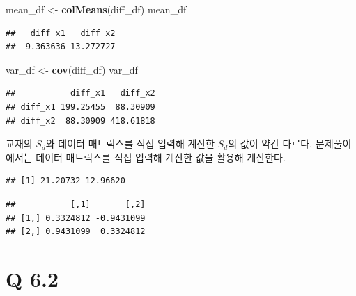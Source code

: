 \documentclass[
]{article}
\newenvironment{Shaded}{\begin{snugshade}}{\end{snugshade}}
\newcommand{\FunctionTok}[1]{\textcolor[rgb]{0.13,0.29,0.53}{\textbf{#1}}}
\newcommand{\NormalTok}[1]{#1}
\newcommand{\OtherTok}[1]{\textcolor[rgb]{0.56,0.35,0.01}{#1}}
\newcommand{\SpecialCharTok}[1]{\textcolor[rgb]{0.81,0.36,0.00}{\textbf{#1}}}
\begin{document}
\begin{Shaded}
\begin{Highlighting}[]
\NormalTok{mean\_df }\OtherTok{\textless{}{-}} \FunctionTok{colMeans}\NormalTok{(diff\_df)}
\NormalTok{mean\_df}
\end{Highlighting}
\end{Shaded}

\begin{verbatim}
##   diff_x1   diff_x2 
## -9.363636 13.272727
\end{verbatim}

\begin{Shaded}
\begin{Highlighting}[]
\NormalTok{var\_df }\OtherTok{\textless{}{-}} \FunctionTok{cov}\NormalTok{(diff\_df)}
\NormalTok{var\_df}
\end{Highlighting}
\end{Shaded}

\begin{verbatim}
##           diff_x1   diff_x2
## diff_x1 199.25455  88.30909
## diff_x2  88.30909 418.61818
\end{verbatim}

교재의 \(S_d\)와 데이터 매트릭스를 직접 입력해 계산한 \(S_d\)의 값이
약간 다르다. 문제풀이에서는 데이터 매트릭스를 직접 입력해 계산한 값을
활용해 계산한다.

\begin{Shaded}
\end{Shaded}

\begin{verbatim}
## [1] 21.20732 12.96620
\end{verbatim}

\begin{Shaded}
\end{Shaded}

\begin{verbatim}
##           [,1]       [,2]
## [1,] 0.3324812 -0.9431099
## [2,] 0.9431099  0.3324812
\end{verbatim}

\section{Q 6.2}\label{q-6.2}
\end{document}
